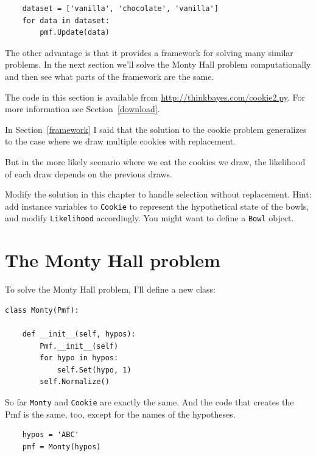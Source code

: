 \documentclass[12pt]{book}
\begin{document}
\begin{verbatim}
    dataset = ['vanilla', 'chocolate', 'vanilla']
    for data in dataset:
        pmf.Update(data)
\end{verbatim}

The other advantage is that it provides a framework for solving many
similar problems.  In the next section we'll solve the Monty Hall
problem computationally and then see what parts of the framework are
the same.

The code in this section is available from
\url{http://thinkbayes.com/cookie2.py}.
  For more information
see Section~\ref{download}.

\begin{exercise}

In Section~\ref{framework} I said that the solution to the cookie
problem generalizes to the case where we draw multiple cookies
with replacement.

But in the more likely scenario where we eat the cookies we draw,
the likelihood of each draw depends on the previous draws.

Modify the solution in this chapter to handle selection without
replacement.  Hint: add instance variables to {\tt Cookie} to
represent the hypothetical state of the bowls, and modify
{\tt Likelihood} accordingly.  You might want to define a 
{\tt Bowl} object.

\end{exercise}


\section{The Monty Hall problem}

To solve the Monty Hall problem, I'll define a new class:

\begin{verbatim}
class Monty(Pmf):

    def __init__(self, hypos):
        Pmf.__init__(self)
        for hypo in hypos:
            self.Set(hypo, 1)
        self.Normalize()
\end{verbatim}

So far \verb"Monty" and \verb"Cookie" are exactly the same.
And the code that creates the Pmf is the same, too, except for
the names of the hypotheses.

\begin{verbatim}
    hypos = 'ABC'
    pmf = Monty(hypos)
\end{verbatim}
\end{document}
